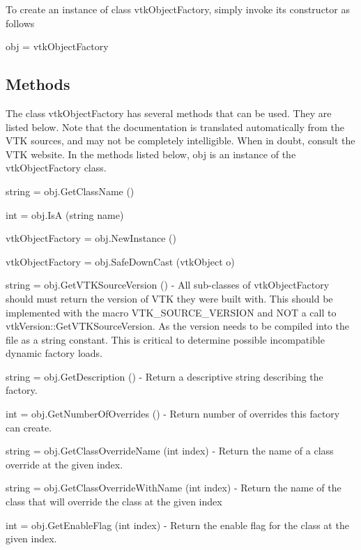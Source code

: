 To create an instance of class vtk\-Object\-Factory, simply invoke its constructor as follows \begin{DoxyVerb}  obj = vtkObjectFactory
\end{DoxyVerb}
 \hypertarget{vtkwidgets_vtkxyplotwidget_Methods}{}\subsection{Methods}\label{vtkwidgets_vtkxyplotwidget_Methods}
The class vtk\-Object\-Factory has several methods that can be used. They are listed below. Note that the documentation is translated automatically from the V\-T\-K sources, and may not be completely intelligible. When in doubt, consult the V\-T\-K website. In the methods listed below, {\ttfamily obj} is an instance of the vtk\-Object\-Factory class. 
\begin{DoxyItemize}
\item {\ttfamily string = obj.\-Get\-Class\-Name ()}  
\item {\ttfamily int = obj.\-Is\-A (string name)}  
\item {\ttfamily vtk\-Object\-Factory = obj.\-New\-Instance ()}  
\item {\ttfamily vtk\-Object\-Factory = obj.\-Safe\-Down\-Cast (vtk\-Object o)}  
\item {\ttfamily string = obj.\-Get\-V\-T\-K\-Source\-Version ()} -\/ All sub-\/classes of vtk\-Object\-Factory should must return the version of V\-T\-K they were built with. This should be implemented with the macro V\-T\-K\-\_\-\-S\-O\-U\-R\-C\-E\-\_\-\-V\-E\-R\-S\-I\-O\-N and N\-O\-T a call to vtk\-Version\-::\-Get\-V\-T\-K\-Source\-Version. As the version needs to be compiled into the file as a string constant. This is critical to determine possible incompatible dynamic factory loads.  
\item {\ttfamily string = obj.\-Get\-Description ()} -\/ Return a descriptive string describing the factory.  
\item {\ttfamily int = obj.\-Get\-Number\-Of\-Overrides ()} -\/ Return number of overrides this factory can create.  
\item {\ttfamily string = obj.\-Get\-Class\-Override\-Name (int index)} -\/ Return the name of a class override at the given index.  
\item {\ttfamily string = obj.\-Get\-Class\-Override\-With\-Name (int index)} -\/ Return the name of the class that will override the class at the given index  
\item {\ttfamily int = obj.\-Get\-Enable\-Flag (int index)} -\/ Return the enable flag for the class at the given index.  

\end{DoxyItemize}
